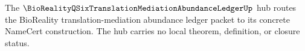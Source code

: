 The $\BioRealityQSixTranslationMediationAbundanceLedgerUp$ hub routes the BioReality translation-mediation abundance ledger packet to its concrete NameCert construction. The hub carries no local theorem, definition, or closure status.

